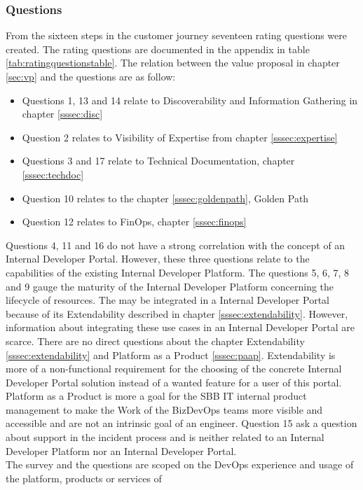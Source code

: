 \documentclass[a4paper,12pt]{article}
\begin{document}
    \subsubsection{Questions}
    From the sixteen steps in the customer journey seventeen rating questions were created.
    The rating questions are documented in the appendix in table \ref{tab:ratingquestionstable}.
    The relation between the value proposal in chapter \ref{sec:vp} and the questions are as follow:
    \begin{itemize}
        \item Questions 1, 13 and 14 relate to Discoverability and Information Gathering in chapter \ref{sssec:disc}
        \item Question 2 relates to Visibility of Expertise from chapter \ref{sssec:expertise}
        \item Questions 3 and 17 relate to Technical Documentation, chapter \ref{sssec:techdoc}
        \item Question 10 relates to the chapter \ref{sssec:goldenpath}, Golden Path
        \item Question 12 relates to FinOps, chapter \ref{sssec:finops}
    \end{itemize}
    Questions 4, 11 and 16 do not have a strong correlation with the concept of an Internal Developer Portal.
    However, these three questions relate to the capabilities of the existing Internal Developer Platform.
    The questions 5, 6, 7, 8 and 9 gauge the maturity of the Internal Developer Platform concerning the lifecycle of resources.
    The may be integrated in a Internal Developer Portal because of its Extendability described in chapter \ref{sssec:extendability}.
    However, information about integrating these use cases in an Internal Developer Portal are scarce.
    There are no direct questions about the chapter Extendability \ref{sssec:extendability} and Platform as a Product
    \ref{sssec:paap}.
    Extendability is more of a non-functional requirement for the choosing of the concrete Internal Developer Portal
    solution instead of a wanted feature for a user of this portal.
    Platform as a Product is more a goal for the SBB IT internal product management to make the Work of the BizDevOps
    teams more visible and accessible and are not an intrinsic goal of an engineer.
    Question 15 ask a question about support in the incident process and is neither related to an Internal Developer Platform
    nor an Internal Developer Portal. \\
    The survey and the questions are scoped on the DevOps experience and usage of the platform, products or services of
\end{document}
